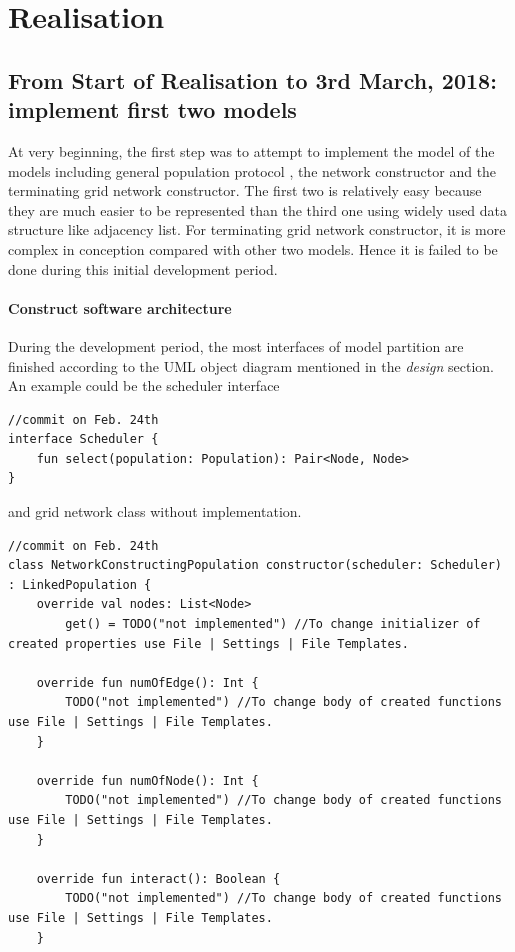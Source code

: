 \section{Realisation}
\subsection{From Start of Realisation to 3rd March, 2018: implement first two models}
At very beginning, the first step was to attempt to implement the model of the
models including general population protocol \cite{AspnesR2007}, the network constructor \cite{MS16a} and
the terminating grid network constructor\cite{Mi17}. The first two is relatively easy because
they are much easier to be represented than the third one using widely used data structure
like adjacency list. For terminating grid network constructor, it is more complex in conception compared with
other two models. Hence it is failed to be done during this initial development period.
\paragraph{Construct software architecture}
During the development period, the most interfaces of model partition are finished according to the UML object
diagram mentioned in the \textit{design} section. An example could be the scheduler interface

\begin{lstlisting}[caption = {Interface design}, style = mykotlin]
//commit on Feb. 24th
interface Scheduler {
    fun select(population: Population): Pair<Node, Node>
}
\end{lstlisting}
\noindent
and grid network class without implementation.
\begin{lstlisting}[caption = {Grid network interface (early screenshot)}, style = mykotlin]
//commit on Feb. 24th
class NetworkConstructingPopulation constructor(scheduler: Scheduler) : LinkedPopulation {
    override val nodes: List<Node>
        get() = TODO("not implemented") //To change initializer of created properties use File | Settings | File Templates.

    override fun numOfEdge(): Int {
        TODO("not implemented") //To change body of created functions use File | Settings | File Templates.
    }

    override fun numOfNode(): Int {
        TODO("not implemented") //To change body of created functions use File | Settings | File Templates.
    }

    override fun interact(): Boolean {
        TODO("not implemented") //To change body of created functions use File | Settings | File Templates.
    }
\end{lstlisting}

